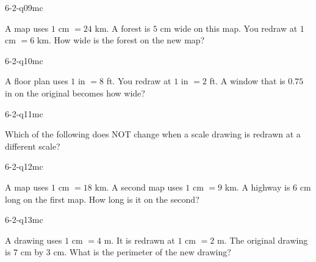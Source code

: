\begin{practiceQuestion}{6-2-q09}{mc}
\begin{questionText}
A map uses $1$ cm $= 24$ km. A forest is $5$ cm wide on this map. You redraw at $1$ cm $= 6$ km. How wide is the forest on the new map?
\end{questionText}
\end{practiceQuestion}

\begin{practiceQuestion}{6-2-q10}{mc}
\begin{questionText}
A floor plan uses $1$ in $= 8$ ft. You redraw at $1$ in $= 2$ ft. A window that is $0.75$ in on the original becomes how wide?
\end{questionText}
\end{practiceQuestion}

\begin{practiceQuestion}{6-2-q11}{mc}
\begin{questionText}
Which of the following does NOT change when a scale drawing is redrawn at a different scale?
\end{questionText}
\end{practiceQuestion}

\begin{practiceQuestion}{6-2-q12}{mc}
\begin{questionText}
A map uses $1$ cm $= 18$ km. A second map uses $1$ cm $= 9$ km. A highway is $6$ cm long on the first map. How long is it on the second?
\end{questionText}
\end{practiceQuestion}

\begin{practiceQuestion}{6-2-q13}{mc}
\begin{questionText}
A drawing uses $1$ cm $= 4$ m. It is redrawn at $1$ cm $= 2$ m. The original drawing is $7$ cm by $3$ cm. What is the perimeter of the new drawing?
\end{questionText}
\end{practiceQuestion}

